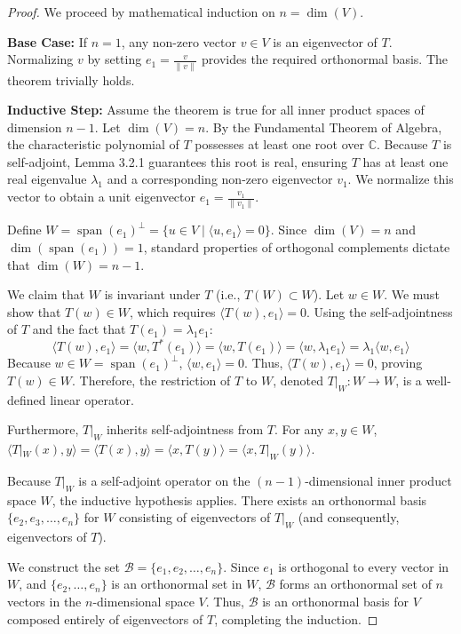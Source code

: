 \begin{proof}
We proceed by mathematical induction on $n = \dim(V)$. 

\textbf{Base Case:} If $n = 1$, any non-zero vector $v \in V$ is an eigenvector of $T$. Normalizing $v$ by setting $e_1 = \frac{v}{\|v\|}$ provides the required orthonormal basis. The theorem trivially holds.

\textbf{Inductive Step:} Assume the theorem is true for all inner product spaces of dimension $n - 1$. Let $\dim(V) = n$. By the Fundamental Theorem of Algebra, the characteristic polynomial of $T$ possesses at least one root over $\mathbb{C}$. Because $T$ is self-adjoint, Lemma 3.2.1 guarantees this root is real, ensuring $T$ has at least one real eigenvalue $\lambda_1$ and a corresponding non-zero eigenvector $v_1$. We normalize this vector to obtain a unit eigenvector $e_1 = \frac{v_1}{\|v_1\|}$.

Define $W = \operatorname{span}(e_1)^\perp = \{ u \in V \mid \langle u, e_1 \rangle = 0 \}$. Since $\dim(V) = n$ and $\dim(\operatorname{span}(e_1)) = 1$, standard properties of orthogonal complements dictate that $\dim(W) = n - 1$. 

We claim that $W$ is invariant under $T$ (i.e., $T(W) \subset W$). Let $w \in W$. We must show that $T(w) \in W$, which requires $\langle T(w), e_1 \rangle = 0$. Using the self-adjointness of $T$ and the fact that $T(e_1) = \lambda_1 e_1$:
\[
\langle T(w), e_1 \rangle = \langle w, T^*(e_1) \rangle = \langle w, T(e_1) \rangle = \langle w, \lambda_1 e_1 \rangle = \lambda_1 \langle w, e_1 \rangle
\]
Because $w \in W = \operatorname{span}(e_1)^\perp$, $\langle w, e_1 \rangle = 0$. Thus, $\langle T(w), e_1 \rangle = 0$, proving $T(w) \in W$. Therefore, the restriction of $T$ to $W$, denoted $T|_W : W \to W$, is a well-defined linear operator.

Furthermore, $T|_W$ inherits self-adjointness from $T$. For any $x, y \in W$, $\langle T|_W(x), y \rangle = \langle T(x), y \rangle = \langle x, T(y) \rangle = \langle x, T|_W(y) \rangle$. 

Because $T|_W$ is a self-adjoint operator on the $(n-1)$-dimensional inner product space $W$, the inductive hypothesis applies. There exists an orthonormal basis $\{e_2, e_3, \dots, e_n\}$ for $W$ consisting of eigenvectors of $T|_W$ (and consequently, eigenvectors of $T$).

We construct the set $\mathcal{B} = \{e_1, e_2, \dots, e_n\}$. Since $e_1$ is orthogonal to every vector in $W$, and $\{e_2, \dots, e_n\}$ is an orthonormal set in $W$, $\mathcal{B}$ forms an orthonormal set of $n$ vectors in the $n$-dimensional space $V$. Thus, $\mathcal{B}$ is an orthonormal basis for $V$ composed entirely of eigenvectors of $T$, completing the induction.
\end{proof}
